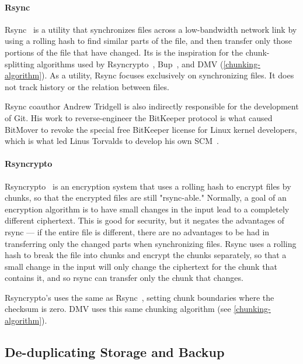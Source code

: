 \paragraph{Rsync}
\label{related-rsync}

Rsync~\cite{rsynctechreport} is a utility that synchronizes files across a low-band\-width network link by using a rolling hash to find similar parts of the file, and then transfer only those portions of the file that have changed.
Its  is the inspiration for the chunk-splitting algorithms used by Rsyncrypto~\cite{rsyncrypto_algorithm}, Bup~\cite{bup_design}, and \gls{DMV} (\autoref{chunking-algorithm}).
As a utility, Rsync focuses exclusively on synchronizing files.
It does not track history or the relation between files.

Rsync coauthor Andrew Tridgell is also indirectly responsible for the development of Git.
His work to reverse-engineer the BitKeeper protocol is what caused BitMover to revoke the special free BitKeeper license for Linux kernel developers, which is what led Linus Torvalds to develop his own \gls{SCM}~\cite{git_10_years_interview}.


\paragraph{Rsyncrypto}
\label{related-rsyncrypto}

Rsyncrypto~\cite{rsyncrypto_algorithm} is an encryption system that uses a roll\-ing hash to encrypt files by chunks, so that the encrypted files are still "rsync-able." Normally, a goal of an encryption algorithm is to have small changes in the input lead to a completely different ciphertext.
This is good for security, but it negates the advantages of rsync --- if the entire file is different, there are no advantages to be had in transferring only the changed parts when synchronizing files.
Rsync uses a rolling hash to break the file into chunks and encrypt the chunks separately, so that a small change in the input will only change the ciphertext for the chunk that contains it, and so rsync can transfer only the chunk that changes.

Rsyncrypto's uses the same  as Rsync~\cite{rsyncrypto_algorithm,rsynctechreport}, setting chunk boundaries where the checksum is zero.
\gls{DMV} uses this same chunking algorithm (see \autoref{chunking-algorithm}).


\subsection{De-duplicating Storage and Backup}

